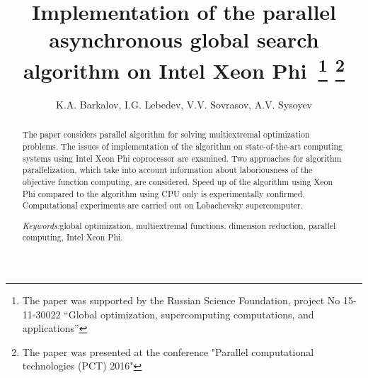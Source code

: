 \documentclass[a4paper]{article}
\begin{document}
\title{Implementation of the parallel asynchronous global search algorithm on Intel Xeon Phi\
\footnote{
The paper was supported by the Russian Science Foundation, project No 15-11-30022 “Global optimization, supercomputing  computations, and applications”}
\footnote{
The paper was presented at the conference "Parallel computational technologies (PCT) 2016"}}
\author{K.A. Barkalov, I.G. Lebedev, V.V. Sovrasov, A.V. Sysoyev}
\date{}
\maketitle
\thispagestyle{firststyle}
\begin{abstract}
The paper considers parallel algorithm for solving multiextremal optimization problems. The issues of implementation of the algorithm on state-of-the-art computing systems using Intel Xeon Phi coprocessor are examined. Two approaches for algorithm parallelization, which take into account information about laboriousness of the objective function computing, are considered. Speed up of the algorithm using Xeon Phi compared to the algorithm using CPU only is experimentally confirmed. Computational experiments are carried out on Lobachevsky supercomputer.
\par
\textit{Keywords:}global optimization, multiextremal functions, dimension reduction, parallel computing, Intel Xeon Phi.
\end{abstract}
\nocite{*}
\end{document}
